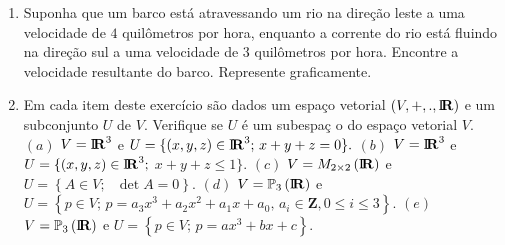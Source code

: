 \documentclass{report}
\begin{document}
\begin{Exercise}
\begin{enumerate}

\item \label{5lista3} Suponha que um barco est\'{a} atravessando
um rio na dire\c{c}\~{a}o leste a uma velocidade de $4$
quil\^{o}metros por hora, enquanto a corrente do rio est\'{a}
fluindo na dire\c{c}\~{a}o sul a uma velocidade de $3$
quil\^{o}metros por hora. Encontre a velocidade resultante do
barco. Represente graficamente.


\item \label{6lista3}  Em cada item deste exerc\'{i}cio s\~{a}o
dados um espa\c{c}o vetorial
$(V,+,.,%
\mbox{${\rm I}\!\mbox{\boldmath $ {\rm R}$}$}%
\Bbb{)}$ e um subconjunto $U$ de $V$. Verifique se $U$ \'{e} um subespa\c{c}%
o do espa\c{c}o vetorial $V$.\newline
$(a)$ $V=%
\mbox{${\rm I}\!\mbox{\boldmath $ {\rm R}$}$}%
^{3}$ e $U=\{(x,y,z)\in
\mbox{${\rm I}\!\mbox{\boldmath $ {\rm R}$}$}%
^{3};\,x+y+z=0\}.$\newline
$(b)$ $V=%
\mbox{${\rm I}\!\mbox{\boldmath $ {\rm R}$}$}%
^{3}$ e $U=\{(x,y,z)\in
\mbox{${\rm I}\!\mbox{\boldmath $ {\rm R}$}$}%
^{3};$ $x+y+z\leq 1\}.$\newline
$(c)$ $V=M_{2\times 2}\left(
\mbox{${\rm I}\!\mbox{\boldmath $ {\rm R}$}$}%
\right) $ e $U=\left\{ A\in V;\text{ }\det A=0\right\} $.\newline
$(d)$ $V=\Bbb{P}_{3}\left(
\mbox{${\rm I}\!\mbox{\boldmath $ {\rm R}$}$}%
\right) \ $e $U=\left\{ p\in
V;\,p=a_{3}x^{3}+a_{2}x^{2}+a_{1}x+a_{0}\text{, }a_{i}\in
\mathbf{Z,}0\leq i\leq 3\right\} $.\newline
$(e)$
$V=\Bbb{P}_{3}\left(
\mbox{${\rm I}\!\mbox{\boldmath $ {\rm R}$}$}%
\right) $ e $U=\left\{ p\in V;\,p=ax^{3}+bx+c\right\} .$


\end{enumerate}
\end{Exercise}
\end{document}

